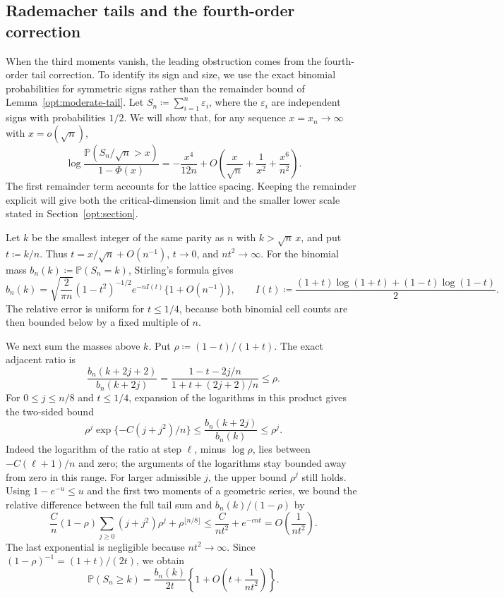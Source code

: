 \documentclass[11pt,letterpaper]{article}
\theoremstyle{remark}
\newcommand{\Pp}{\mathbb P}
\begin{document}
\subsection{Rademacher tails and the fourth-order correction}
\label{app:rademacher-tail}
When the third moments vanish, the leading obstruction comes from the
fourth-order tail correction. To identify its sign and size, we use
the exact binomial probabilities for symmetric signs rather than the
remainder bound of Lemma~\ref{opt:moderate-tail}.
Let \(S_n\coloneqq\sum_{i=1}^n\varepsilon_i\), where the
\(\varepsilon_i\) are independent signs with probabilities \(1/2\).
We will show that, for any sequence \(x=x_n\to\infty\) with
\(x=o(\sqrt n)\),
\begin{equation}
 \log\frac{\Pp(S_n/\sqrt n>x)}{1-\Phi(x)}
 =-\frac{x^4}{12n}
   +O\!\left(\frac{x}{\sqrt n}+\frac1{x^2}
                    +\frac{x^6}{n^2}\right).
 \label{app:rad-tail-expansion}
\end{equation}
The first remainder term accounts for the lattice spacing. Keeping
the remainder explicit will give both the critical-dimension limit
and the smaller lower scale stated in Section~\ref{opt:section}.

Let \(k\) be the smallest integer of the same parity as \(n\) with
\(k>\sqrt n\,x\), and put \(t\coloneqq k/n\). Thus
\(t=x/\sqrt n+O(n^{-1})\), \(t\to0\), and \(nt^2\to\infty\).
For the binomial mass \(b_n(k)\coloneqq\Pp(S_n=k)\), Stirling's
formula gives
\begin{equation}
 b_n(k)=\sqrt{\frac2{\pi n}}(1-t^2)^{-1/2}
             e^{-nI(t)}\{1+O(n^{-1})\},\qquad
 I(t)\coloneqq\frac{(1+t)\log(1+t)+(1-t)\log(1-t)}2.
 \label{app:rad-mass}
\end{equation}
The relative error is uniform for \(t\le1/4\), because both
binomial cell counts are then bounded below by a fixed multiple of \(n\).

We next sum the masses above \(k\). Put
\(\rho\coloneqq(1-t)/(1+t)\). The exact adjacent ratio is
\[
 \frac{b_n(k+2j+2)}{b_n(k+2j)}
 =\frac{1-t-2j/n}{1+t+(2j+2)/n}\le\rho.
\]
For \(0\le j\le n/8\) and \(t\le1/4\), expansion of the logarithms
in this product gives the two-sided bound
\[
 \rho^j\exp\{-C(j+j^2)/n\}
 \le\frac{b_n(k+2j)}{b_n(k)}\le\rho^j.
\]
Indeed the logarithm of the ratio at step \(\ell\), minus
\(\log\rho\), lies between \(-C(\ell+1)/n\) and zero; the
arguments of the logarithms stay bounded away from zero in this range.
For larger admissible \(j\), the upper bound \(\rho^j\) still holds.
Using \(1-e^{-u}\le u\) and the first two moments of a geometric
series, we bound the relative difference between the full tail sum and
\(b_n(k)/(1-\rho)\) by
\[
 \frac Cn(1-\rho)\sum_{j\ge0}(j+j^2)\rho^j
       +\rho^{\lfloor n/8\rfloor}
 \le \frac{C}{nt^2}+e^{-c nt}
 =O\!\left(\frac1{nt^2}\right).
\]
The last exponential is negligible because \(nt^2\to\infty\).
Since \((1-\rho)^{-1}=(1+t)/(2t)\), we obtain
\begin{equation}
 \Pp(S_n\ge k)
 =\frac{b_n(k)}{2t}
       \left\{1+O\!\left(t+\frac1{nt^2}\right)\right\}.
 \label{app:rad-tail-sum}
\end{equation}
\end{document}
